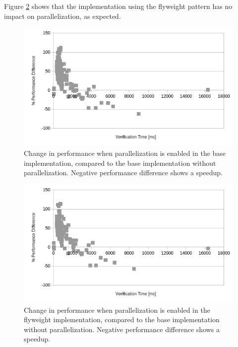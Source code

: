 \documentclass[11pt]{article}
\begin{document}
    Figure \ref{fig:parallelization-flyweight} shows that the implementation using the flyweight
    pattern has no impact on parallelization, as expected.

    \begin{figure}[H]
        \includegraphics[width=\linewidth]{parallelization.png}
        \caption{Change in performance when parallelization is enabled in the base implementation, compared to the base implementation without parallelization. Negative performance difference shows a speedup.}
        \label{fig:parallelization}
    \end{figure}

    \begin{figure}[H]
        \includegraphics[width=\linewidth]{parallelization-flyweight.png}
        \caption{
            Change in performance when parallelization is enabled in the flyweight implementation, compared to the base implementation without parallelization.
            Negative performance difference shows a speedup.
        }
        \label{fig:parallelization-flyweight}
    \end{figure}
\end{document}
